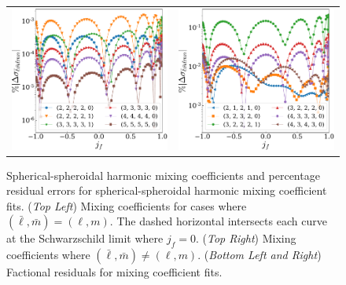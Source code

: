 \documentclass[twocolumn,aps,prd,floatfix,preprintnumbers,a4paper,nofootinbib,
superscriptaddress,10pt]{revtex4-1}
\def\jf{j_f}
\begin{document}
\begin{figure}[htb]
\begin{tabular}{lr}
    \includegraphics[width=\figfactor\textwidth]{fig/issue2_ysprod_3.pdf} & \includegraphics[width=\figfactor\textwidth]{fig/issue2_ysprod_4.pdf}
  \end{tabular}
	\caption{ Spherical-spheroidal harmonic mixing coefficients and percentage residual errors for spherical-spheroidal harmonic mixing coefficient fits. (\textit{Top Left}) Mixing coefficients for cases where $(\bar{\ell},\bar{m})=(\ell,m)$. The dashed horizontal intersects each curve at the Schwarzschild limit where $\jf=0$. (\textit{Top Right}) Mixing coefficients where $(\bar{\ell},\bar{m})\neq(\ell,m)$. (\textit{Bottom Left and Right}) Factional residuals for mixing coefficient fits. }
  \label{fig:ys}
\end{figure}
\end{document}
